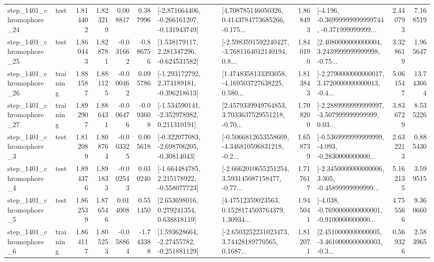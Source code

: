 \begin{tabular}{llrrrrllrlrr}
 step\_1401\_chromophore\_24 &      test &      1.814402 &    1.823219 &      0.008817 &  0.387996 &  [-2.871664406, -0.266161207, -0.131943749] &  [4.708785146050326, 0.4143784773685266, -0.175... &       1.868493 &  [-4.196, -0.36999999999999744, -0.371999999999... &            2.440793 &          7.168519 \\
 step\_1401\_chromophore\_25 &      test &      1.860443 &    1.828781 &     -0.031662 & -0.886756 &    [1.538179117, 2.281347296, -0.624531582] &  [-2.5983591592240427, -3.7681164012140194, 0.8... &       1.840190 &  [2.4080000000000004, 3.2439999999999998, -0.75... &            3.328619 &          1.965647 \\
 step\_1401\_chromophore\_26 &  training &      1.881587 &    1.881125 &     -0.000462 &  0.095786 &   [-1.293172792, 2.374189181, -0.396218613] &  [1.4748358133393058, -4.169503727638225, 0.580... &       1.813843 &  [-2.2790000000000017, 3.4720000000000013, -0.4... &            5.061547 &         13.743664 \\
 step\_1401\_chromophore\_27 &  training &      1.892907 &    1.886431 &     -0.006476 & -0.093608 &   [-1.534590141, -2.352978982, 0.211310191] &  [2.4579339949764853, 3.7033637529551218, -0.70... &       1.708200 &  [-2.2889999999999997, -3.507999999999999, 0.03... &            3.836729 &          8.535226 \\
  step\_1401\_chromophore\_3 &      test &      1.812089 &    1.808764 &     -0.003325 &  0.005618 &   [-0.322077083, -2.698706205, -0.30814043] &  [-0.5066812653558609, -4.346810596831218, -0.2... &       1.658739 &  [-0.5369999999999999, -4.093, -0.2830000000000... &            2.632213 &          0.885430 \\
  step\_1401\_chromophore\_4 &      test &      1.894376 &    1.891833 &     -0.002543 &  0.030240 &   [-1.664484785, 2.215178922, -0.558077723] &  [-2.6662010655251254, 3.593145087158477, -0.77... &       1.717617 &  [-2.3450000000000006, 3.305, -0.45899999999999... &            5.162135 &          3.599515 \\
  step\_1401\_chromophore\_5 &      test &      1.862539 &    1.876546 &      0.014008 &  0.551450 &     [2.653698016, 0.279241354, 0.638818119] &  [4.47512359023563, 0.1528174503764379, 1.30934... &       1.945041 &  [-4.038, -0.7690000000000001, -0.9100000000000... &            4.755566 &          9.360660 \\
  step\_1401\_chromophore\_6 &  training &      1.864117 &    1.805253 &     -0.058864 & -1.743388 &    [1.593628664, -2.27455782, -0.251881129] &  [-2.6503252231023473, 3.74428189770565, 0.1687... &       1.812071 &  [2.4510000000000005, -3.4610000000000003, -0.3... &            0.569326 &          2.583965 \\

\end{tabular}
